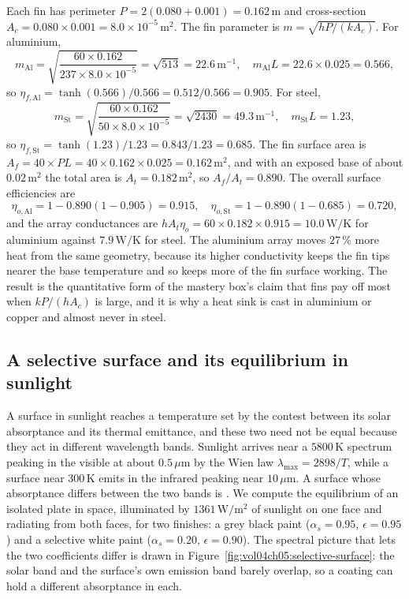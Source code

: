 Each fin has perimeter $P = 2(0.080 + 0.001) = 0.162\,\text{m}$ and
cross-section $A_c = 0.080 \times 0.001 = 8.0 \times 10^{-5}\,\text{m}^2$.
The fin parameter is $m = \sqrt{hP/(kA_c)}$. For aluminium,
\[
m_{\text{Al}} = \sqrt{\frac{60 \times 0.162}{237 \times 8.0 \times
10^{-5}}} = \sqrt{513} = 22.6\,\text{m}^{-1}, \quad m_{\text{Al}} L =
22.6 \times 0.025 = 0.566,
\]
so $\eta_{f,\text{Al}} = \tanh(0.566)/0.566 = 0.512/0.566 = 0.905$. For
steel,
\[
m_{\text{St}} = \sqrt{\frac{60 \times 0.162}{50 \times 8.0 \times
10^{-5}}} = \sqrt{2430} = 49.3\,\text{m}^{-1}, \quad m_{\text{St}} L =
1.23,
\]
so $\eta_{f,\text{St}} = \tanh(1.23)/1.23 = 0.843/1.23 = 0.685$. The fin
surface area is $A_f = 40 \times P L = 40 \times 0.162 \times 0.025 =
0.162\,\text{m}^2$, and with an exposed base of about $0.02\,\text{m}^2$
the total area is $A_t = 0.182\,\text{m}^2$, so $A_f/A_t = 0.890$. The
overall surface efficiencies are
\[
\eta_{o,\text{Al}} = 1 - 0.890(1 - 0.905) = 0.915, \quad
\eta_{o,\text{St}} = 1 - 0.890(1 - 0.685) = 0.720,
\]
and the array conductances are $h A_t \eta_o = 60 \times 0.182 \times
0.915 = 10.0\,\text{W}/\si{\kelvin}$ for aluminium against $7.9\,\text{W}/
\si{\kelvin}$ for steel. The aluminium array moves $27\,\%$ more heat from
the same geometry, because its higher conductivity keeps the fin tips
nearer the base temperature and so keeps more of the fin surface working.
The result is the quantitative form of the mastery box's claim that fins
pay off most when $kP/(hA_c)$ is large, and it is why a heat sink is cast
in aluminium or copper and almost never in steel.

\subsection{A selective surface and its equilibrium in sunlight}

A surface in sunlight reaches a temperature set by the contest between
its solar absorptance and its thermal emittance, and these two need not be
equal because they act in different wavelength bands. Sunlight arrives near
a $5800\,\si{\kelvin}$ spectrum peaking in the visible at about
$0.5\,\mu\text{m}$ by the Wien law $\lambda_{\max} = 2898/T$, while a
surface near $300\,\si{\kelvin}$ emits in the infrared peaking near
$10\,\mu\text{m}$. A surface whose absorptance differs between the two
bands is . We compute the equilibrium of an
isolated plate in space, illuminated by $1361\,\text{W}/\text{m}^2$ of
sunlight on one face and radiating from both faces, for two finishes: a
grey black paint ($\alpha_s = 0.95$, $\epsilon = 0.95$) and a selective
white paint ($\alpha_s = 0.20$, $\epsilon = 0.90$). The spectral picture
that lets the two coefficients differ is drawn in
Figure~\ref{fig:vol04ch05:selective-surface}: the solar band and the
surface's own emission band barely overlap, so a coating can hold a
different absorptance in each.

